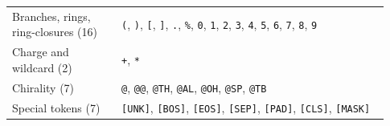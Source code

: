 \begin{table}[htbp]
\begin{tabular}{@{}p{0.27\linewidth} p{0.66\linewidth}@{}}
    \addlinespace[3pt]
    Branches, rings, ring-closures (16) & \texttt{(}, \texttt{)}, \texttt{[}, \texttt{]}, \texttt{.}, \texttt{\%}, \texttt{0}, \texttt{1}, \texttt{2}, \texttt{3}, \texttt{4}, \texttt{5}, \texttt{6}, \texttt{7}, \texttt{8}, \texttt{9} \\
    \addlinespace[3pt]
    Charge and wildcard (2) & \texttt{+}, \texttt{*} \\
    \addlinespace[3pt]
    Chirality (7) & \texttt{@}, \texttt{@@}, \texttt{@TH}, \texttt{@AL}, \texttt{@OH}, \texttt{@SP}, \texttt{@TB} \\
    \addlinespace[3pt]
    Special tokens (7) & \texttt{[UNK]}, \texttt{[BOS]}, \texttt{[EOS]}, \texttt{[SEP]}, \texttt{[PAD]}, \texttt{[CLS]}, \texttt{[MASK]} \\
    \bottomrule
  \end{tabular}
\end{table}
